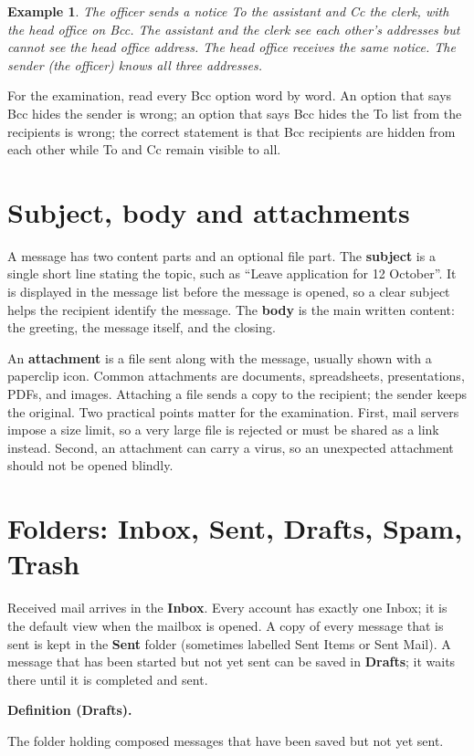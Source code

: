 \documentclass[11pt]{article}
\newtheorem{example}{Example}[section]
\newenvironment{definitionbox}[1]{%
  \par\noindent\textbf{Definition (#1).}\ \itshape
}{\par\vspace{0.3em}}
\begin{document}
\begin{example}
The officer sends a notice To the assistant and Cc the clerk, with the head
office on Bcc. The assistant and the clerk see each other's addresses but
cannot see the head office address. The head office receives the same notice.
The sender (the officer) knows all three addresses.
\end{example}

For the examination, read every Bcc option word by word. An option that says
Bcc hides the sender is wrong; an option that says Bcc hides the To list from
the recipients is wrong; the correct statement is that Bcc recipients are
hidden from each other while To and Cc remain visible to all.

\section{Subject, body and attachments}
A message has two content parts and an optional file part. The
\textbf{subject} is a single short line stating the topic, such as ``Leave
application for 12 October''. It is displayed in the message list before the
message is opened, so a clear subject helps the recipient identify the
message. The \textbf{body} is the main written content: the greeting, the
message itself, and the closing.

An \textbf{attachment} is a file sent along with the message, usually shown
with a paperclip icon. Common attachments are documents, spreadsheets,
presentations, PDFs, and images. Attaching a file sends a copy to the
recipient; the sender keeps the original. Two practical points matter for the
examination. First, mail servers impose a size limit, so a very large file is
rejected or must be shared as a link instead. Second, an attachment can carry
a virus, so an unexpected attachment should not be opened blindly.

\section{Folders: Inbox, Sent, Drafts, Spam, Trash}
Received mail arrives in the \textbf{Inbox}. Every account has exactly one
Inbox; it is the default view when the mailbox is opened. A copy of every
message that is sent is kept in the \textbf{Sent} folder (sometimes labelled
Sent Items or Sent Mail). A message that has been started but not yet sent can
be saved in \textbf{Drafts}; it waits there until it is completed and sent.

\begin{definitionbox}{Drafts}
The folder holding composed messages that have been saved but not yet sent.
\end{definitionbox}
\end{document}
